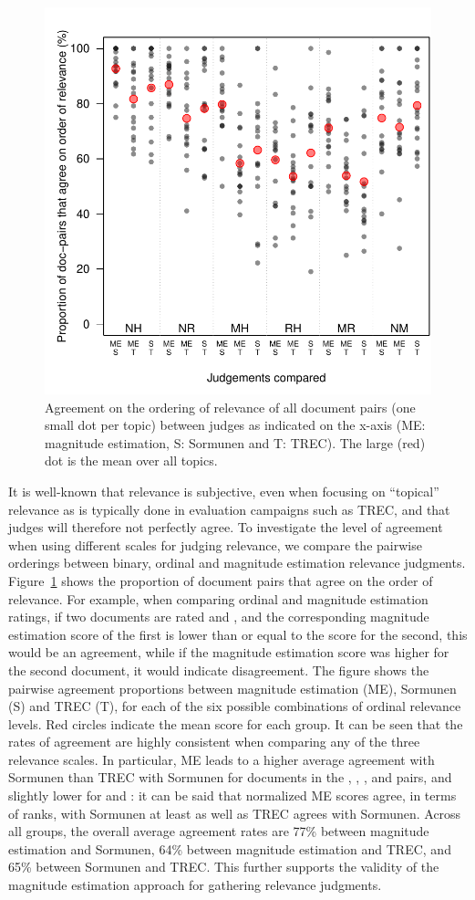 \begin{figure}[tp]
  \centering
  \includegraphics[width=.7\linewidth]{figs/pairwiseSummary2.pdf}
  \vspace{-0.5cm}
  \caption{Agreement on the ordering of relevance of all document pairs (one
small dot per topic) between judges as indicated on the x-axis (ME: magnitude
estimation, S: Sormunen and T: TREC). The large (red) dot is the mean over all topics.
  \label{fig:agreement}}
\end{figure}

It is well-known that relevance is subjective, even when focusing on
``topical'' relevance as is typically done in evaluation campaigns such
as TREC, and that judges will therefore not perfectly agree.
To investigate the level of agreement when using different scales for
judging relevance, we compare the pairwise orderings between binary,
ordinal and magnitude estimation relevance judgments.
Figure~\ref{fig:agreement} shows the proportion of document pairs that
agree on the order of relevance.
For example, when comparing ordinal and magnitude estimation ratings,
if two documents are rated \nn and \mm, and the corresponding magnitude
estimation score of the first is lower than or equal to the score for
the second, this would be an agreement, while if the magnitude
estimation score was higher for the second document, it would indicate
disagreement.
The figure shows the pairwise agreement proportions between magnitude
estimation (ME), Sormunen (S) and TREC (T), for each of the six
possible combinations of ordinal relevance levels.
Red circles indicate the mean score for each group.
It can be seen that the rates of agreement are highly consistent when
comparing any of the three relevance scales.
In particular, ME leads to a higher average agreement with Sormunen than
TREC with Sormunen for documents in the \nn\hh, \nn\rr, \mm\hh, and 
\mm\rr pairs, and slightly lower for \rr\hh and \nn\mm: it can be said
that normalized ME scores agree, in terms of ranks, with Sormunen at
least as well as TREC agrees with Sormunen.
Across all groups, the overall average agreement rates are 77\%
between magnitude estimation and Sormunen, 
64\% between magnitude estimation and TREC, and 65\%
between Sormunen and TREC.
This further supports the validity of the magnitude estimation approach
for gathering relevance judgments.




